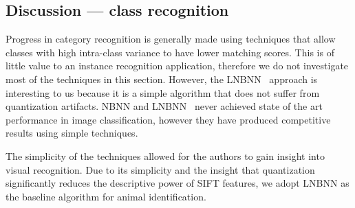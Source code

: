     \subsection{Discussion --- class recognition}

        Progress in category recognition is generally made using techniques that allow classes with high
          intra-class variance to have lower matching scores.
        This is of little value to an instance recognition application, therefore we do not investigate most of
          the techniques in this section.
        However, the LNBNN~\cite{mccann_local_2012} approach is interesting to us because it is a simple
          algorithm that does not suffer from quantization artifacts.
        NBNN and LNBNN~\cite{boiman_defense_2008,mccann_local_2012} never achieved state of the art performance
          in image classification, however they have produced competitive results using simple techniques.

        The simplicity of the techniques allowed for the authors to gain insight into visual recognition.
        Due to its simplicity and the insight that quantization significantly reduces the descriptive power of
        SIFT features, we adopt LNBNN as the baseline algorithm for animal identification.

